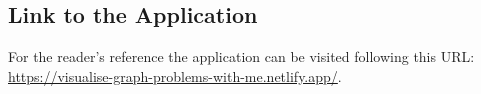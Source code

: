 \subsection{Link to the Application}
For the reader's reference the application can be visited following this
URL: \\
\href{https://visualise-graph-problems-with-me.netlify.app/} {https://visualise-graph-problems-with-me.netlify.app/}.






% 


%
